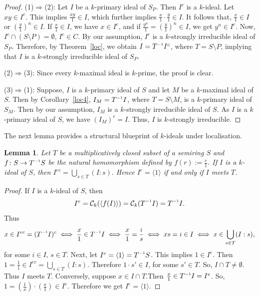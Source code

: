 \documentclass[11pt,leqno]{amsart}
\newcommand{\inv}{^{\raisebox{.2ex}{$\scriptscriptstyle-1$}}}
\newtheorem{lemma}[theorem]{Lemma}
\theoremstyle{definition}
\numberwithin{equation}{section}
\begin{document}
\begin{proof}
	(1)$\Rightarrow$(2):
Let $I$ be a $k$-primary ideal of $S_P$. Then $I^c$ is a $k$-ideal. Let $xy\in I^c$. This implies $\frac{xy}{1}\in I$, which further implies $\frac{x}{1}\cdot \frac{y}{1} \in I$. It follows that, $\frac{x}{1} \in I$ or $(\frac{y}{1})^n\in I$. If $\frac{x}{1} \in I$, we have $x \in I^c$, and if $\frac{y^n}{1}=(\frac{y}{1})^n \in I$, we get $y^n\in I^c$. Now, $I^c\cap (S\setminus P)=\emptyset$, $I^c\in C$. By our assumption, $I^c$ is a $k$-strongly irreducible ideal of $S_P$. Therefore, by Theorem~\ref{loc}, we obtain $I=T\inv I^c$, where $T=S\setminus P$, implying that $I$ is a $k$-strongly irreducible ideal of $S_P$.

    (2)$\Rightarrow$(3):
Since every $k$-maximal ideal is $k$-prime, the proof is clear.

    (3)$\Rightarrow$(1): 
Suppose, $I$ is a $k$-primary ideal of $S$ and let $M$ be a $k$-maximal ideal of $S$. Then by Corollary~\ref{loc4}, $I_M=T\inv I$, where $T=S\setminus M$, is a $k$-primary ideal of $S_M$. Then by our assumption, $I_M$ is a $k$-strongly irreducible ideal of $S$. As $I$ is a $k$-primary ideal of $S$, we have $(I_M)^c=I$. Thus, $I$ is  $k$-strongly irreducible.
\end{proof}
The next lemma provides a structural blueprint of $k$-ideals under localisation. 

\begin{lemma}\label{loc8}
    Let $T$ be a multiplicatively closed subset of a semiring $S$ and $f\colon S\to T\inv S$ be the natural homomorphism defined by  $f(r):=\frac{r}{1}$. If $I$ is a $k$-ideal of $S$, then $I^{ec} = \bigcup\limits_{s\in T}(I:s).$ Hence $I^e=\langle1\rangle$ if and only if $I$ meets $T$.
\end{lemma}

\begin{proof}
    If $I$ is a $k$-ideal of $S$, then  \[I^e=\mathcal{C}_k(\langle f(I) \rangle)=\mathcal{C}_k(T\inv I)=T\inv I.\] Thus \[x\in I^{ec}=(T\inv I)^{c}\iff\frac{x}{1}\in T\inv I\iff\frac{x}{1}=\frac{i}{s}\iff xs=i\in I\iff x\in \bigcup_{s\in T}(I:s),\]  for some $i\in I$, $s\in T$.
Next, let  $I^{e}=\langle1 \rangle = T\inv S$. This implies $1\in I^{e}$. Then $1=\frac{1}{1} \in I^{ec} = \bigcup_{s\in T}$$(I:s)$. Therefore $1\cdot s'\in I$, for some $s'\in T$. So, $I\cap T\neq \emptyset$. Thus $I$ meets $T$. Conversely, suppose $x\in I\cap T$.Then $\frac{x}{1} \in T\inv I=I^{e}$. So, $1=(\frac{1}{x})\cdot(\frac{x}{1})\in I^{e}$. Therefore we get $I^{e}=\langle 1\rangle$.
\end{proof}
\end{document}
